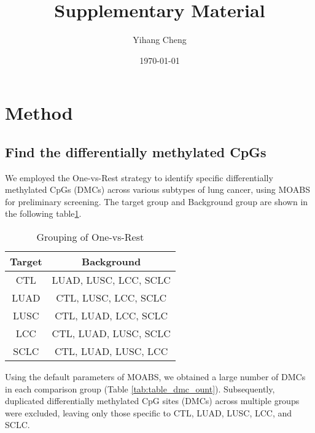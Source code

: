 \documentclass[10pt]{article}
\title{Supplementary Material}
\author{Yihang Cheng}
\date{\today}
\begin{document}
\maketitle


\section{Method}\label{sec:method}

\subsection{Find the differentially methylated CpGs}\label{subsec:find-the-differentially-methylated-cpgs-(dmcs)}

We employed the One-vs-Rest strategy to identify specific differentially methylated CpGs (DMCs) across various
subtypes of lung cancer, using MOABS\cite{sun_moabs_2014} for preliminary screening. The target group and Background
group are shown in the following table\ref*{tab:grouping}.

\begin{table}[htbp]
    \begin{center}
        \caption{ Grouping of One-vs-Rest }
        \begin{tabular}{|c|c|}
            \hline
            Target & Background            \\
            \hline
            CTL    & LUAD, LUSC, LCC, SCLC \\
            LUAD   & CTL, LUSC, LCC, SCLC  \\
            LUSC   & CTL, LUAD, LCC, SCLC  \\
            LCC    & CTL, LUAD, LUSC, SCLC \\
            SCLC   & CTL, LUAD, LUSC, LCC  \\
            \hline
        \end{tabular}
    \end{center}
    \label{tab:grouping}
\end{table}

Using the default parameters of MOABS, we obtained a large number of DMCs in each comparison group (Table \ref{tab:table_dmc_ount}).
Subsequently, duplicated differentially methylated CpG sites (DMCs) across multiple groups were excluded, leaving
only those specific to CTL, LUAD, LUSC, LCC, and SCLC.
\end{document}
